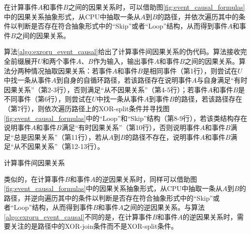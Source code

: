 在计算事件$A$和事件$B$之间的因果关系时，可以借助图\ref{fig:event_causal_formulas}中的因果关系抽象形式，从CPU中抽取一条从$A$到$B$的路径，并依次遍历其中的条件以判断是否存在符合抽象形式中的“Skip”或者“Loop”结构，从而得到事件$A$和事件$B$之间的因果关系。

算法\ref{algo:exroru_event_causal}给出了计算事件间因果关系的伪代码。算法接收完全前缀展开$U$和两个事件$A$、$B$作为输入，输出事件$A$和事件$B$之间的因果关系。算法分两种情况抽取因果关系：若事件$A$和事件$B$是相同事件（第1行），则尝试在$U$中找一条从事件$A$到自身的自循环路径，若该路径存在说明事件$A$与自身满足“有时因果关系”（第2-3行），否则满足“从不因果关系”（第4-5行）；若事件$A$和事件$B$是不同事件（第6行），则尝试在$U$中找一条从事件$A$到事件$B$的路径，若该路径存在（第7行），则依次遍历路径上的XOR-split条件并寻找图\ref{fig:event_causal_formulas}中的“Loop”和“Skip”结构（第8-9行），若该类结构存在说明事件$A$和事件$B$满足“有时因果关系”（第10行），否则说明事件$A$和事件$B$满足“总是因果关系”（第11行），若从$A$到$B$的路径不存在，说明事件$A$和事件$B$满足“从不因果关系”（第12-13行）。

\begin{algorithm}[htbp]
  \LinesNumbered
  \caption{计算事件间因果关系}
  \label{algo:exroru_event_causal}
   {
  	 {
  	} 
  } 
\end{algorithm}


类似的，在计算事件$B$和事件$A$的逆因果关系时，同样可以借助图\ref{fig:event_causal_formulas}中的因果关系抽象形式，从CPU中抽取一条从$A$到$B$的路径，并逆向遍历其中的条件以判断是否存在符合抽象形式中的“Skip”或者“Loop”结构，从而得到事件$B$和事件$A$之间的逆因果关系。与算法\ref{algo:exroru_event_causal}不同的是，在计算事件$B$和事件$A$的逆因果关系时，需要关注的是路径中的XOR-join条件而不是XOR-split条件。

